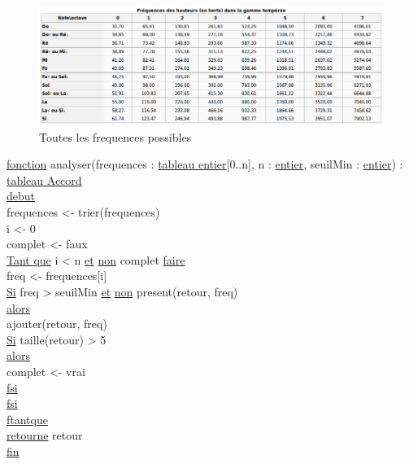 \documentclass{article}
\begin{document}
\begin{figure}[H]
\centering
\includegraphics[scale=0.5]{Frequences}
\caption{Toutes les frequences possibles}
\end{figure}


\begin{tabbing}

\ul{fonction} analyser(frequences : \ul{tableau entier}[0..n], n : \ul{entier}, seuilMin : \ul{entier}) : \ul{tableau Accord}\\
\ul{debut}\\
frequences <- trier(frequences)\\
i <- 0\\
complet <- faux\\
\ul{Tant que} i < n \ul{et} \ul{non} complet \ul{faire}\\
    freq <- frequences[i]\\
    \ul{Si} freq > seuilMin \ul{et} \ul{non} present(retour, freq)\\
    \ul{alors}\\
        ajouter(retour, freq)\\
        \ul{Si} taille(retour) > 5\\
        \ul{alors}\\
            complet <- vrai\\
        \ul{fsi}\\
    \ul{fsi}\\
\ul{ftantque}\\
\ul{retourne} retour\\
\ul{fin}\\
\end{tabbing}
\end{document}
